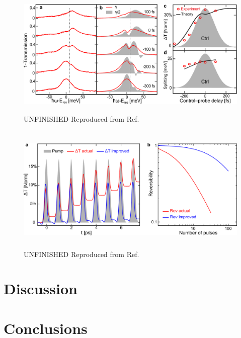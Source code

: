 \begin{figure}[ht]
	\centering
	\includegraphics[height=2.4in]{images/chapter_coherent/resonant}
	\caption{{\color{red}UNFINISHED} Reproduced from Ref.\ \cite{mack2019}}
\end{figure}

\clearpage

\begin{figure}[ht]
	\centering
	\includegraphics[height=2.4in]{images/chapter_coherent/switching_reversibility}
	\caption{{\color{red}UNFINISHED} Reproduced from Ref.\ \cite{mack2019}}
\end{figure}




\section{Discussion}

\section{Conclusions}
